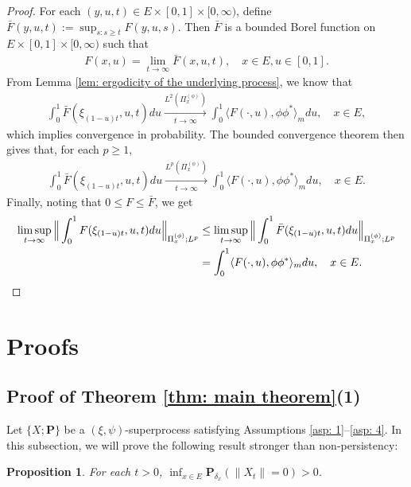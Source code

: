 \documentclass[12pt,a4paper]{amsart}
\newtheorem{prop}[thm]{Proposition}
\theoremstyle{definition}
\numberwithin{equation}{section}
\begin{document}
\begin{proof}
	For each $(y,u,t)\in E\times [0,1]\times [0,\infty)$, define $\bar F(y,u,t) := \sup_{s:s\geq t} F(y,u,s)$.
	Then $\bar F$ is a bounded Borel  function on $E\times [0,1]\times [0,\infty)$ such that
\begin{align}
	F(x,u)
	= \lim_{t\to \infty} \bar F(x,u,t),
	\quad x\in E, u\in [0,1].
\end{align}
From Lemma \ref{lem: ergodicity of the underlying process}, we know that
\begin{align}
	\int_0^1 \bar F(\xi_{(1-u)t},u,t) du
	\xrightarrow[t\to \infty]{L^2(\Pi_x^{(\phi)})}
	\int_0^1 \langle F(\cdot , u), \phi\phi^*\rangle_m du,
	\quad x\in E,
\end{align}
which implies convergence in probability.
The bounded convergence theorem then gives that, for each $p \geq 1$,
\begin{align}
	\int_0^1 \bar F(\xi_{(1-u)t},u,t) du
	\xrightarrow[t\to \infty]{L^p(\Pi_x^{(\phi)})}
	\int_0^1 \langle F(\cdot , u), \phi\phi^*\rangle_m du,
	\quad x\in E.
\end{align}
Finally, noting that $0\leq F \leq \bar F$, we get
\begin{align}
	\limsup_{ t \to \infty}  \Big\| \int_0^1 F(\xi_{(1-u) t },u,t) du  \Big\|_{\Pi_x^{(\phi)};L^p}
	&\leq \limsup_{ t \to \infty}  \Big\| \int_0^1 \bar F(\xi_{(1-u) t },u,t) du  \Big\|_{\Pi_x^{(\phi)};L^p}
	\\& = \int_0^1 \langle F(\cdot, u), \phi \phi^*\rangle_m du,
	\quad x\in E. \qedhere
\end{align}
\end{proof}

\section{Proofs}
\subsection{Proof of Theorem \ref{thm: main theorem}(1)}
\label{sec: proof of result 1}
Let $\{X; \mathbf P\}$ be a $(\xi, \psi)$-superprocess satisfying
Assumptions \ref{asp: 1}--\ref{asp: 4}.
In this subsection, we will prove the following result stronger than non-persistency:

\begin{prop} \label{prop: non-presistent}
	For each $t > 0$, $\inf_{x\in E} \mathbf P_{\delta_x}(\|X_t\|= 0) > 0$.
\end{prop}
\end{document}
